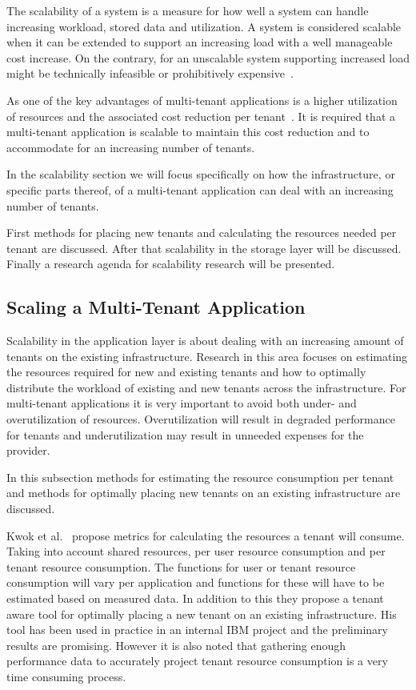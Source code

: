 The scalability of a system is a measure for how well a system can handle increasing workload, stored data and utilization.
A system is considered scalable when it can be extended to support an increasing load with a well manageable cost increase.
On the contrary, for an unscalable system supporting increased load might be technically infeasible or prohibitively expensive~\cite{bondi2000scalability}.

As one of the key advantages of multi-tenant applications is a higher utilization of resources and the associated cost reduction per tenant~\cite{bezemer2010multi}.
It is required that a multi-tenant application is scalable to maintain this cost reduction and to accommodate for an increasing number of tenants.

In the scalability section we will focus specifically on how the infrastructure, or specific parts thereof, of a multi-tenant application can deal with an increasing number of tenants.

First methods for placing new tenants and calculating the resources needed per tenant are discussed. After that scalability in the  storage layer will be discussed. Finally a research agenda for scalability research will be presented.

\subsection{Scaling a Multi-Tenant Application}
Scalability in the application layer is about dealing with an increasing amount of tenants on the existing infrastructure.
Research in this area focuses on estimating the resources required for new and existing tenants and how to optimally distribute the workload of existing and new tenants across the infrastructure. 
For multi-tenant applications it is very important to avoid both under- and overutilization of resources.
Overutilization will result in degraded performance for tenants and underutilization may result in unneeded expenses for the provider.

In this subsection methods for estimating the resource consumption per tenant and methods for optimally placing new tenants on an existing infrastructure are discussed.

Kwok et al.~\cite{kwok2008resource} propose metrics for calculating the resources a tenant will consume.
Taking into account shared resources, per user resource consumption and per tenant resource consumption.
The functions for user or tenant resource consumption will vary per application and functions for these will have to be estimated based on measured data.
In addition to this they propose a tenant aware tool for optimally placing a new tenant on an existing infrastructure.
His tool has been used in practice in an internal IBM project and the preliminary results are promising. 
However it is also noted that gathering enough performance data to accurately project tenant resource consumption is a very time consuming process.

